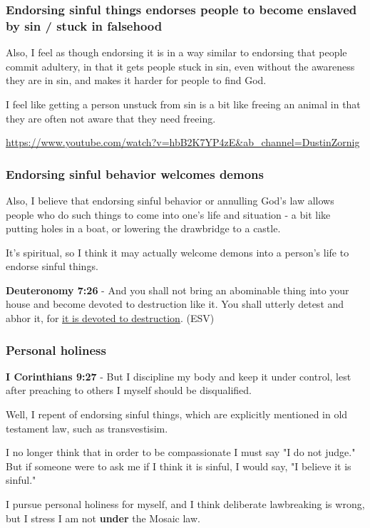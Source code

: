 \documentclass[11pt]{article}
\begin{document}
\subsubsection{Endorsing sinful things endorses people to become enslaved by sin / stuck in falsehood}
\label{sec:org4004fb7}
Also, I feel as though endorsing it is in a
way similar to endorsing that people commit
adultery, in that it gets people stuck in sin,
even without the awareness they are in sin,
and makes it harder for people to find God.

I feel like getting a person unstuck from sin
is a bit like freeing an animal in that they
are often not aware that they need freeing.

\url{https://www.youtube.com/watch?v=hbB2K7YP4zE\&ab\_channel=DustinZornig}

\subsubsection{Endorsing sinful behavior welcomes demons}
\label{sec:orgf41b16a}
Also, I believe that endorsing sinful behavior
or annulling God's law allows people who do
such things to come into one's life and
situation - a bit like putting holes in a
boat, or lowering the drawbridge to a castle.

It's spiritual, so I think it may actually
welcome demons into a person's life to endorse
sinful things.

\textbf{Deuteronomy 7:26} - And you shall not bring an abominable thing into your house and become devoted to destruction like it. You shall utterly detest and abhor it, for \uline{it is devoted to destruction}.  (ESV)

\subsubsection{Personal holiness}
\label{sec:org79277da}
\textbf{I Corinthians 9:27} - But I discipline my body and keep it under control, lest after preaching to others I myself should be disqualified.

Well, I repent of endorsing sinful things,
which are explicitly mentioned in old
testament law, such as transvestisim.

I no longer think that in order to be compassionate I must say "I do not judge."
But if someone were to ask me if I think it is sinful, I would say, "I believe it is sinful."

I pursue personal holiness for myself, and I
think deliberate lawbreaking is wrong,
but I stress I am not \textbf{under} the Mosaic law.
\end{document}

